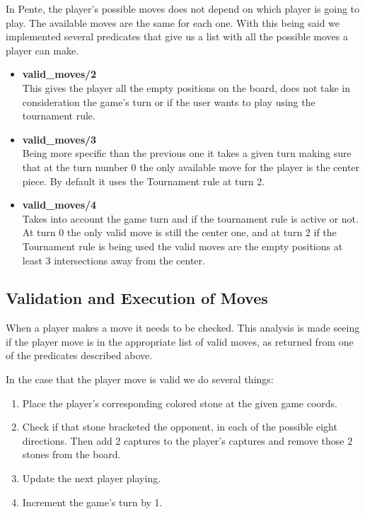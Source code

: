 \documentclass[12pt,a4paper,notitlepage]{article}
\begin{document}
In Pente, the player's possible moves does not depend on which player is going to play. The available moves are the same for each one.
With this being said we implemented several predicates that give us a list with all the possible moves a player can make.

\begin{itemize}
	\item \textbf{valid\_moves/2}\\
	This gives the player all the empty positions on the board, does not take in consideration the game's turn or if the user wants to play using the tournament rule.
	\item \textbf{valid\_moves/3}\\
	Being more specific than the previous one it takes a given turn making sure that at the turn number 0 the only available move for the player is the center piece.
	By default it uses the Tournament rule at turn 2.
	\item \textbf{valid\_moves/4}\\
	Takes into account the game turn and if the tournament rule is active or not. At turn 0 the only valid move is still the center one, and at turn 2 if the Tournament rule is being used the valid moves are the empty positions at least 3 intersections away from the center.
\end{itemize}

\subsection{Validation and Execution of Moves}
\label{subsec:moves}

When a player makes a move it needs to be checked. This analysis is made seeing if the player move is in the appropriate list of valid moves, as returned from one of the predicates described above.

In the case that the player move is valid we do several things:

\begin{enumerate}[label=(\alph*)]
	\item Place the player's corresponding colored stone at the given game coords.
	\item Check if that stone bracketed the opponent, in each of the possible eight directions. Then add 2 captures to the player's captures and remove those 2 stones from the board.
	\item Update the next player playing.
	\item Increment the game's turn by 1.
\end{enumerate}
\end{document}
